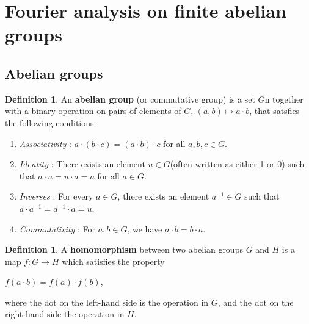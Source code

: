 \documentclass[psamsfonts]{amsart}
\theoremstyle{definition}
\newtheorem{defn}[thm]{Definition}
\theoremstyle{remark}
\numberwithin{equation}{section}
\begin{document}
			\vspace{5mm}
			
	\section{Fourier analysis on finite abelian groups}
		\vspace{5mm}
		\subsection{Abelian groups}
			\begin{defn}
				An \textbf{abelian group} (or commutative group) is a set $G$n together with a binary operation on pairs of elements of $G$, $(a,b) \longmapsto a \cdot b$, that satsfies the following conditions \\
				\begin{enumerate}
					\item \emph{Associativity} : $a \cdot (b \cdot c) = (a \cdot b)\cdot c$ \hspace{2mm} for all $a,b,c \in G$.
					\vspace{2mm}
					\item \emph{Identity} : There exists an element $u \in G$(often written as either 1 or 0) such that $a \cdot u = u \cdot a = a$ \hspace{2mm} for all $a \in G$.
					\vspace{2mm}
					\item \emph{Inverses} : For every $a \in G$, there exists an element $a^{-1} \in G$ such that $a \cdot a^{-1} = a^{-1} \cdot a = u$.
					\vspace{2mm}
					\item \emph{Commutativity} : For $a,b \in G$, we have $a \cdot b = b \cdot a$.
				\end{enumerate}
			\end{defn}
			
			\begin{defn}
				A \textbf{homomorphism} between two abelian groups $G$ and $H$ is a map $f:G \rightarrow H$ which satisfies the property\\
				\begin{center}
					$f(a \cdot b) = f(a) \cdot f(b)$,
				\end{center}
				\vspace{2mm}
				where the dot on the left-hand side is the operation in $G$, and the dot on the right-hand side the operation in $H$.
			\end{defn}
			
\end{document}
